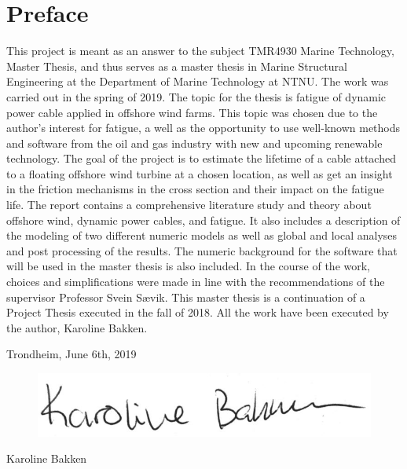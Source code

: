 \hypersetup{pageanchor=true}
%
\chapter*{Preface}
This project is meant as an answer to the subject TMR4930 Marine Technology, Master Thesis, and thus serves as a master thesis in Marine Structural Engineering at the Department of Marine Technology at NTNU. The work was carried out in the spring of 2019. \newline
\newline
The topic for the thesis is fatigue of dynamic power cable applied in offshore wind farms. This topic was chosen due to the author's interest for fatigue, a well as the opportunity to use well-known methods and software from the oil and gas industry with new and upcoming renewable technology. The goal of the project is to estimate the lifetime of a cable attached to a floating offshore wind turbine at a chosen location, as well as get an insight in the friction mechanisms in the cross section and their impact on the fatigue life. The report contains a comprehensive literature study and theory about offshore wind, dynamic power cables, and fatigue. It also includes a description of the modeling of two different numeric models as well as global and local analyses and post processing of the results. The numeric background for the software that will be used in the master thesis is also included. In the course of the work, choices and simplifications were made in line with the recommendations of the supervisor Professor Svein Sævik. \newline
\newline
This master thesis is a continuation of a Project Thesis executed in the fall of 2018. All the work have been executed by the author, Karoline Bakken. 
\newline
\newline
\newline
\newline
\newline
\newline
\begin{center}
    Trondheim, June 6th, 2019
    \end{center}
\begin{figure}[H]
\centering
\includegraphics[scale=0.5]{figures/sign}
\end{figure}
\begin{center}
Karoline Bakken
\end{center}
